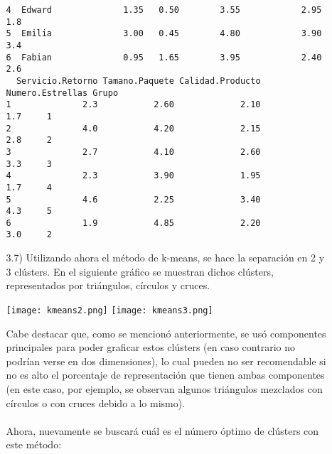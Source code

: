 \documentclass[11pt,a4paper]{report}
\begin{document}
\begin{itemize}
\begin{itemize}
\begin{verbatim}
4  Edward              1.35   0.50        3.55            2.95             1.8
5  Emilia              3.00   0.45        4.80            3.90             3.4
6  Fabian              0.95   1.65        3.95            2.40             2.6
  Servicio.Retorno Tamano.Paquete Calidad.Producto Numero.Estrellas Grupo
1              2.3           2.60             2.10              1.7     1
2              4.0           4.20             2.15              2.8     2
3              2.7           4.10             2.60              3.3     3
4              2.3           3.90             1.95              1.7     4
5              4.6           2.25             3.40              4.3     5
6              1.9           4.85             2.20              3.0     2
\end{verbatim}

\item[3.7)]Utilizando ahora el método de k-means, se hace la separación en 2 y 3 clústers. En el siguiente gráfico se muestran dichos clústers, representados por triángulos, círculos y cruces.
\begin{center}
\texttt{[image: kmeans2.png]}
\texttt{[image: kmeans3.png]}
\end{center}
Cabe destacar que, como se mencionó anteriormente, se usó componentes principales para poder graficar estos clústers (en caso contrario no podrían verse en dos dimensiones), lo cual pueden no ser recomendable si no es alto el porcentaje de representación que tienen ambas componentes (en este caso, por ejemplo, se observan algunos triángulos mezclados con círculos o con cruces debido a lo mismo).\\
\\
Ahora, nuevamente se buscará cuál es el número óptimo de clústers con este método:


\end{itemize}
\end{itemize}
\end{document}
